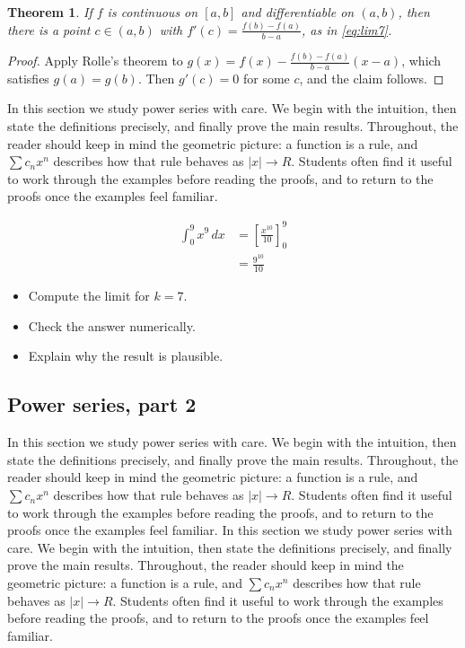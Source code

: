 \documentclass[11pt]{article}
\newtheorem{theorem}{Theorem}[section]
\begin{document}
\begin{theorem}
If $f$ is continuous on $[a,b]$ and differentiable on $(a,b)$, then there is a point $c \in (a,b)$ with $f'(c) = \frac{f(b)-f(a)}{b-a}$, as in \eqref{eq:lim7}.
\end{theorem}

\begin{proof}
Apply Rolle's theorem to $g(x) = f(x) - \frac{f(b)-f(a)}{b-a}(x-a)$, which satisfies $g(a) = g(b)$. Then $g'(c) = 0$ for some $c$, and the claim follows.
\end{proof}

In this section we study power series with care. We begin with the intuition, then state the definitions precisely, and finally prove the main results. Throughout, the reader should keep in mind the geometric picture: a function is a rule, and $\sum c_n x^n$ describes how that rule behaves as $|x| \to R$. Students often find it useful to work through the examples before reading the proofs, and to return to the proofs once the examples feel familiar. 

\begin{align}
  \int_0^{9} x^{9}\,dx &= \left[ \frac{x^{10}}{10} \right]_0^{9} \\
  &= \frac{9^{10}}{10} \label{eq:int7}
\end{align}

\begin{itemize}
  \item Compute the limit for $k = 7$.
  \item Check the answer numerically.
  \item Explain why the result is plausible.
\end{itemize}

\subsection{Power series, part 2}

In this section we study power series with care. We begin with the intuition, then state the definitions precisely, and finally prove the main results. Throughout, the reader should keep in mind the geometric picture: a function is a rule, and $\sum c_n x^n$ describes how that rule behaves as $|x| \to R$. Students often find it useful to work through the examples before reading the proofs, and to return to the proofs once the examples feel familiar. In this section we study power series with care. We begin with the intuition, then state the definitions precisely, and finally prove the main results. Throughout, the reader should keep in mind the geometric picture: a function is a rule, and $\sum c_n x^n$ describes how that rule behaves as $|x| \to R$. Students often find it useful to work through the examples before reading the proofs, and to return to the proofs once the examples feel familiar. 
\end{document}

